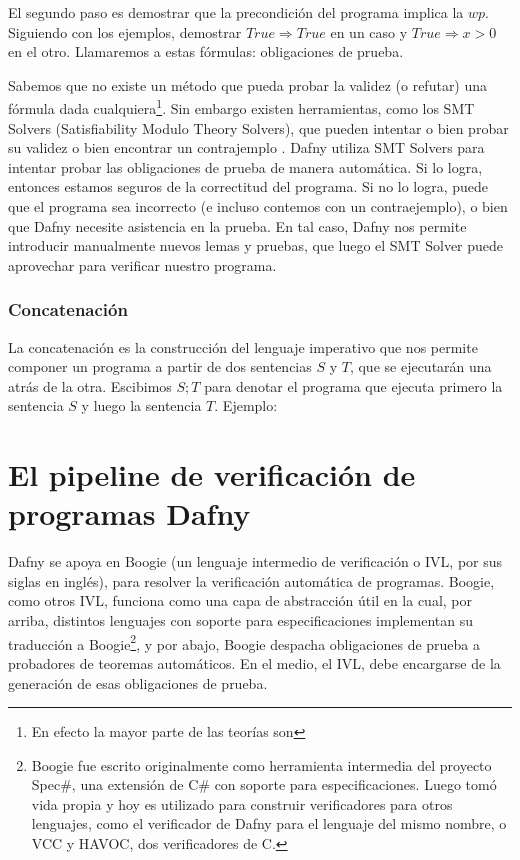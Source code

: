 \documentclass[12pt, a4paper, openany, fleqn]{book}
\begin{document}
    El segundo paso es demostrar que la precondición del programa implica la $wp$.
    Siguiendo con los ejemplos, demostrar $True \Rightarrow True$ en un caso y $True \Rightarrow x > 0$ en el otro.
    Llamaremos a estas fórmulas: obligaciones de prueba.

    Sabemos que no existe un método que pueda probar la validez (o refutar) una fórmula dada cualquiera\footnote{En efecto la mayor parte de las teorías son }. Sin embargo existen herramientas, como los SMT Solvers (Satisfiability Modulo Theory Solvers), que pueden intentar o bien probar su validez o bien encontrar un contrajemplo \cite{10.1007/978-3-030-99524-9_23}. Dafny utiliza SMT Solvers para intentar probar las obligaciones de prueba de manera automática. Si lo logra, entonces estamos seguros de la correctitud del programa. Si no lo logra, puede que el programa sea incorrecto (e incluso contemos con un contraejemplo), o bien que Dafny necesite asistencia en la prueba. En tal caso, Dafny nos permite introducir manualmente nuevos lemas y pruebas, que luego el SMT Solver puede aprovechar para verificar nuestro programa.

    \subsection{Concatenación}
    La concatenación es la construcción del lenguaje imperativo que nos permite componer un programa a partir de dos sentencias $S$ y $T$, que se ejecutarán una atrás de la otra.
    Escibimos $S;T$ para denotar el programa que ejecuta primero la sentencia $S$ y luego la sentencia $T$.
    Ejemplo:

    \chapter{El pipeline de verificación de programas Dafny}

    Dafny se apoya en Boogie (un lenguaje intermedio de verificación o IVL, por sus siglas en inglés), para resolver la verificación automática de programas.
    Boogie, como otros IVL, funciona como una capa de abstracción útil en la cual, por arriba, distintos lenguajes con soporte para especificaciones implementan su traducción a Boogie\footnote{
        Boogie fue escrito originalmente como herramienta intermedia del proyecto Spec\#, una extensión de C\# con soporte para especificaciones. Luego tomó vida propia y hoy es utilizado para construir verificadores para otros lenguajes, como el verificador de Dafny para el lenguaje del mismo nombre, o VCC y HAVOC, dos verificadores de C.
    }, y por abajo, Boogie despacha obligaciones de prueba a probadores de teoremas automáticos. En el medio, el IVL, debe encargarse de la generación de esas obligaciones de prueba.
\end{document}
